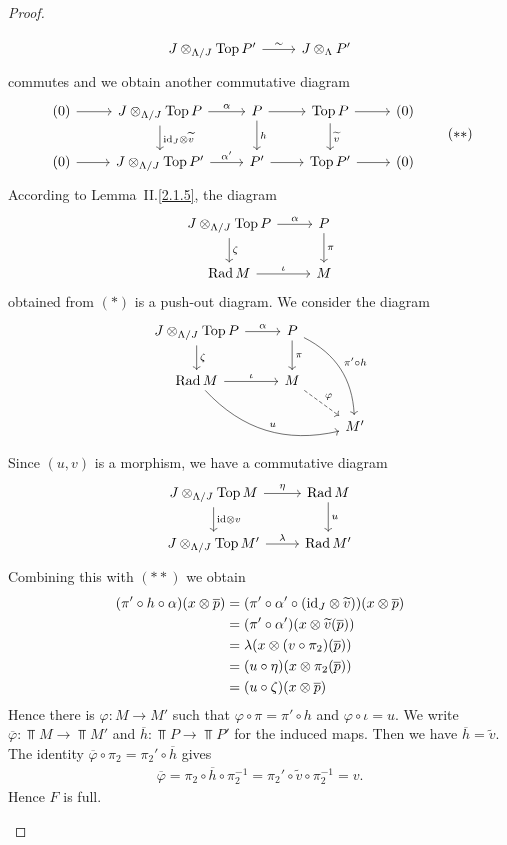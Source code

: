 \begin{proof}
\begin{enumerate}
\[\begin{tikzcd}
J \otimes_{\factor \Lambda {J}} \Top P' \rar["\sim"]& J \otimes_\Lambda P'
\end{tikzcd}\]
 commutes and we obtain another commutative diagram
 \[\begin{tikzcd}
(0) \rar& J \otimes_{\factor \Lambda {J}} \Top P
\rar["\alpha"]\dar["{\id_{J}}\otimes\widetilde v"]& P \rar\dar["h"]& \Top P \rar\dar["\widetilde v"]& (0)\\
(0) \rar& J \otimes_{\factor \Lambda {J}} \Top P'
\rar["\alpha'"]& P' \rar& \Top P' \rar& (0)
\end{tikzcd}\tag{$**$}\]
 According to Lemma~II.\ref{2.1.5}, the diagram
 \[\begin{tikzcd}
J \otimes_{\factor \Lambda {J}} \Top P \rar["\alpha"]\dar["\zeta"]&
P \dar["\pi"]\\
\Rad M \rar["\iota"] & M
\end{tikzcd}\]
 obtained from $(*)$ is a push-out diagram. We consider the diagram
 \[\begin{tikzcd}
J \otimes_{\factor \Lambda {J}} \Top P
\rar["\alpha"]\dar["\zeta"]&
P \dar["\pi"]\ar[ddr, "\pi'\circ h", bend left]\\
\Rad M \rar["\iota"] \ar[rrd, "u", bend right] & M\ar[dr, "\varphi", dashed]\\
&&M'
\end{tikzcd}\]
 Since $(u,v)$ is a morphism, we have a commutative diagram
 \[\begin{tikzcd}
J \otimes_{\factor \Lambda {J}} \Top M \rar["\eta"]\dar["{\id}\otimes v"]&
\Rad M \dar["u"]\\
J \otimes_{\factor \Lambda {J}} \Top M' \rar["\lambda"] &
\Rad M'
\end{tikzcd}\]
 Combining this with $(**)$ we obtain
 \begin{align*}
(\pi' \circ h \circ \alpha)(x \otimes \overline p)
&= (\pi'\circ\alpha'\circ({\operatorname{id}_{J}} \otimes \widetilde v))(x \otimes \overline p)\\
&= (\pi'\circ \alpha')(x \otimes \widetilde v(\overline p))\\
&= \lambda (x \otimes (v \circ \pi_2)(\overline p))\\
&= (u \circ \eta)(x \otimes \pi_2(\overline p))\\
&= (u \circ \zeta)(x \otimes \overline p)
 \end{align*}
 Hence there is $\varphi : M \to M'$ such that $\varphi \circ \pi = \pi' \circ h$ and $\varphi \circ \iota = u$. We
 write $\overline \varphi: \Top M \to \Top M'$ and
 $\overline h: \Top P \to \Top P'$ for the induced maps.
 Then we have $\overline h = \widetilde v$.
 The identity $\overline \varphi \circ \pi_2 = \pi_2' \circ \overline h$ gives
 \begin{align*}
 \overline \varphi = \pi_2 \circ \overline h \circ \pi_2^{-1}
 = \pi_2' \circ \widetilde v \circ \pi_2^{-1}
 = v.
 \end{align*}
 Hence $F$ is full.


\end{enumerate}
\end{proof}
